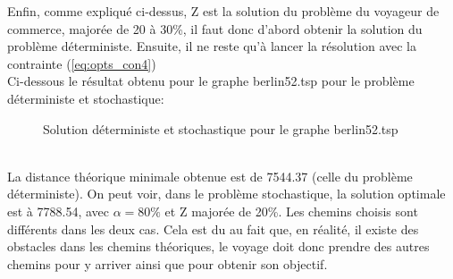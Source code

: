 \documentclass{article}
\begin{document}
Enfin, comme expliqué ci-dessus, Z est la solution du problème du voyageur de commerce, majorée de 20 à 30\%, il faut donc d'abord obtenir la solution du problème déterministe. Ensuite, il ne reste qu'à lancer la résolution avec la contrainte (\ref{eq:opts_con4})\\
Ci-dessous le résultat obtenu pour le graphe berlin52.tsp pour le problème déterministe et stochastique:\\
\begin{figure}[h]\centering
{}
\caption{Solution déterministe et stochastique pour le graphe berlin52.tsp}
\end{figure}\\
La distance théorique minimale obtenue est de 7544.37 (celle du problème déterministe). On peut voir, dans le problème stochastique, la solution optimale est à 7788.54, avec \(\alpha = 80\%\) et Z majorée de 20\%. Les chemins choisis sont différents dans les deux cas. Cela est du au fait que, en réalité, il existe des obstacles dans les chemins théoriques, le voyage doit donc prendre des autres chemins pour y arriver ainsi que pour obtenir son objectif.\\
\end{document}
